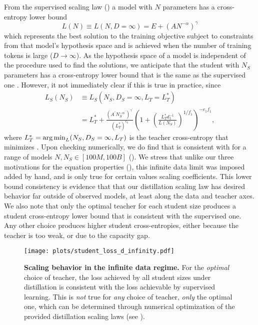 From the supervised scaling law ()
a model with $N$ parameters
has a cross-entropy lower bound
\begin{equation}
    L(N)\equiv L(N,D=\infty)=E+(A N^{-\alpha})^\gamma
    \label{eq:supervised-lower-bound}
\end{equation}
which represents the best solution to the training objective
subject to constraints from that model's hypothesis space \citep{DBLP:journals/corr/abs-2203-15556}
and is achieved when the number of training tokens is large ($D\rightarrow\infty$).
As the hypothesis space of a model is independent of the procedure used to find the solutions,
we anticipate that the student with $N_S$ parameters has a cross-entropy lower bound
that is the same as the supervised one .
However, it not immediately clear if this is true in practice, since
\begin{align}
    L_S(N_S)
    &\equiv L_S(N_S,D_S=\infty,L_T=L_T^*)\\
    &=L_T^*+\frac{(A^\prime N_S^{-\alpha^\prime})^{\gamma^\prime}}{(L_T^*)^{c_0}}\left(1+\left(\frac{L_T^*d_1^{-1}}{L(N_S)}\right)^{1/{f_1}}\right)^{-c_1f_1},
    \label{eq:distillation-lower-bound}
\end{align}
where $L_T^*=\operatorname*{arg\,min}_L(N_S,D_S=\infty,L_T)$ is the teacher cross-entropy that minimizes .
Upon checking numerically, we do find that 
is consistent with 
for a range of models $N,N_S\in[100M,100B]$
().
We stress that unlike our three motivations for the equation properties (), this infinite data limit was imposed added by hand, and is only true for certain values scaling coefficients.
This lower bound consistency is evidence that that our distillation scaling law has desired behavior far outside of observed models, at least along the data and teacher axes.
We also note that only the optimal teacher for each student size produces a student cross-entropy lower bound that is consistent with the supervised one.
Any other choice produces higher student cross-entropies, either because the teacher is too weak, or due to the capacity gap.
\begin{figure}[h]
	\centering
		\texttt{[image: plots/student\_loss\_d\_infinity.pdf]}
	\caption{\textbf{Scaling behavior in the infinite data regime.}
    For the \emph{optimal} choice of teacher, the loss achieved by all student sizes under distillation is consistent with the loss achievable by supervised learning. This is \emph{not} true for \emph{any} choice of teacher, \emph{only} the optimal one, which can be determined through numerical optimization of the provided distillation scaling laws (see ).}
	\label{fig:scaling-law-d-infinity}
\end{figure}

\FloatBarrier
